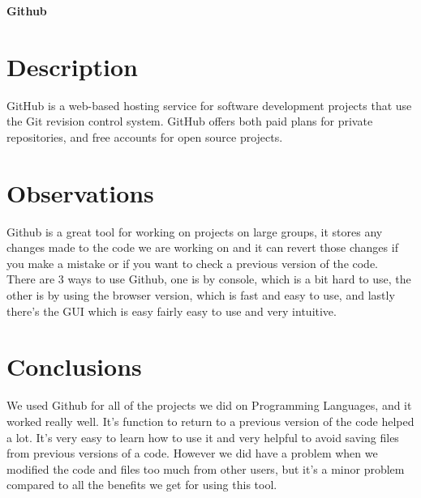 \textbf{Github}


\section{Description}
GitHub is a web-based hosting service for software development projects that use the Git revision control system. GitHub offers both paid plans for private repositories, and free accounts for open source projects.\\

\section{Observations}
Github is a great tool for working on projects on large groups, it stores any changes made to the code we are working on and it can revert those changes if you make a mistake or if you want to check a previous version of the code.\\

There are 3 ways to use Github, one is by console, which is a bit hard to use, the other is by using the browser version, which is fast and easy to use, and lastly there's the GUI which is easy fairly easy to use and very intuitive.
 
\section{Conclusions}
We used Github for all of the projects we did on Programming Languages, and it worked really well. It's function to return to a previous version of the code helped a lot. It's very easy to learn how to use it and very helpful to avoid saving files from previous versions of a code. However we did have a problem when we modified the code and files too much from other users, but it's a minor problem compared to all the benefits we get for using this tool. 


